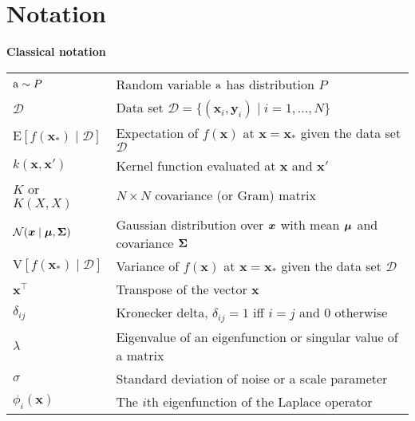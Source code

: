 \documentclass[10pt]{article}
\begin{document}
	\section{Notation}
	\centerline{\bf Classical notation}
	\bgroup
	\def\arraystretch{1.5}
	\begin{tabular}{p{1.25in}p{4in}}
		$\displaystyle {\textnormal{a}} \sim P$ & Random variable ${\textnormal{a}}$ has distribution $P$\\
		$\mathcal{D}$ & Data set $\mathcal{D} = \{(\mathbf{x}_i,\mathbf{y}_i) \mid i = 1,\dots, N\}$\\
		$\mathrm{E}[{f}(\mathbf{x}_*)\mid \mathcal{D}]$  & Expectation of $f(\mathbf{x})$ at $\mathbf{x} = \mathbf{x}_*$ given the data set $\mathcal{D}$ \\
		$k(\mathbf{x}, \mathbf{x}')$ & Kernel function evaluated at $\mathbf{x}$ and $\mathbf{x}'$\\
		$K$ or $K(X,X)$ & $N \times N$ covariance (or Gram) matrix\\
		$\displaystyle \mathcal{N} ( {\bm{x}} \mid {\bm{\mu}} , {\bm{\Sigma}})$ & Gaussian distribution %
		over ${\bm{x}}$ with mean ${\bm{\mu}}$ and covariance ${\bm{\Sigma}}$ 
		\\
		$\mathrm{V}[{f}(\mathbf{x}_*)\mid \mathcal{D}]$  & Variance of $f(\mathbf{x})$ at $\mathbf{x} = \mathbf{x}_*$ given the data set $\mathcal{D}$ \\
		$\mathbf{x}^\top$ & Transpose of the vector $\mathbf{x}$\\
		
		$\delta_{ij}$ & Kronecker delta, $\delta_{ij} = 1$ iff $i=j$ and $0$ otherwise\\
		$\lambda$ & Eigenvalue of an eigenfunction or singular value of a matrix\\
		
		$\sigma$ & Standard deviation of noise or a scale parameter\\
		$\phi_i(\mathbf{x})$ & The $i$th eigenfunction of the Laplace operator\\
	\end{tabular}
	\egroup\\
	
\end{document}
